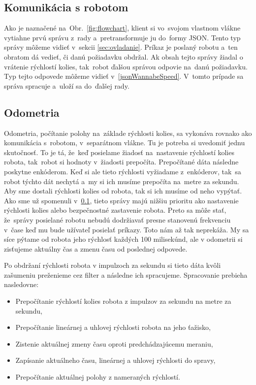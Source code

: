 \subsection{Komunikácia s robotom}
\label{sec:robotComms}

Ako je naznačené na~Obr.~\ref{fig:flowchart}, klient si vo~svojom vlastnom vlákne vytiahne
prvú správu z~rady a~pretransformuje ju do~formy JSON. Tento typ správy môžeme vidieť v~sekcii
\ref{sec:ovladanie}. Príkaz je poslaný robotu a~ten obratom dá vedieť, či danú požiadavku obdržal.
Ak obsah tejto správy žiadal o vrátenie rýchlostí kolies, tak~robot ďalšou správou odpovie
na~danú požiadavku. Typ tejto odpovede môžeme vidieť v~\ref{jsonWannabeSpeed}. V~tomto prípade
sa správa spracuje a~uloží sa do~ďalšej rady.

\subsection{Odometria}
\label{sec:odometria}

Odometria, počítanie polohy na~základe rýchlosti kolies, sa vykonáva rovnako ako komunikácia
s~robotom, v~separátnom vlákne. Tu je potreba si uvedomiť jednu skutočnosť. To je tá, že~keď
posielame žiadosť na~nastavenie rýchlostí kolies robota, tak~robot si hodnoty v~žiadosti prepočíta.
Prepočítané dáta následne poskytne enkóderom. Keď si ale tieto rýchlosti vyžiadame z~enkóderov,
tak~sa robot týchto dát nechytá a~my si ich musíme prepočíta na~metre za sekundu. Aby sme dostali
rýchlosti kolies od robota, tak si ich musíme od neho vypýtať. Ako sme už spomenuli v~\ref{sec:robotComms},
tieto správy majú nižšiu prioritu ako nastavenie rýchlosti kolies alebo bezpečnostné zastavenie
robota. Preto sa môže stať, že~správy posielané robotu nebudú dodržiavať presne stanovenú frekvenciu
v~čase keď mu bude užívateľ posielať príkazy. Toto nám až tak neprekáža. My sa síce pýtame od robota jeho rýchlosť každých 100 milisekúnd, ale v odometrii si zisťujeme aktuálny čas a zmenu času od poslednej odpovede.

Po obdržaní rýchlosti robota v impulzoch za sekundu si tieto dáta kvôli zašumeniu preženieme cez filter a následne ich spracujeme. Spracovanie prebieha nasledovne:
\begin{itemize}
	\item Prepočítanie rýchlostí kolies robota z impulzov za sekundu na metre za sekundu,
	\item Prepočítanie lineárnej a uhlovej rýchlosti robota na jeho ťažisko,
	\item Zistenie aktuálnej zmeny času oproti predchádzajúcemu meraniu,
	\item Zapísanie aktuálneho času, lineárnej a uhlovej rýchlosti do spravy,
	\item Prepočítanie aktuálnej polohy z nameraných rýchlostí.
\end{itemize}

